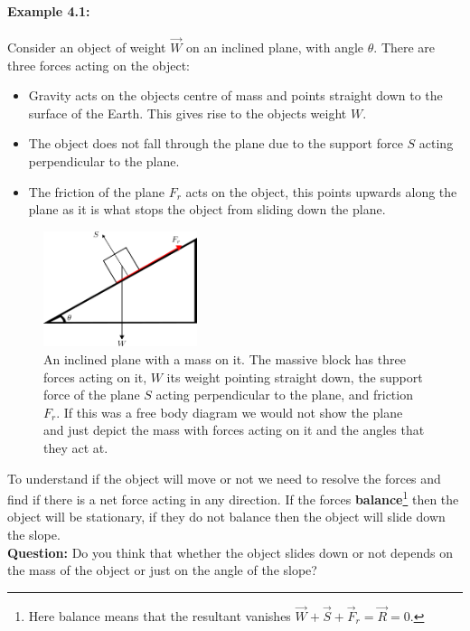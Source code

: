 \documentclass[a4paper,12pt]{book}
\begin{document}
\paragraph{Example 4.1:} Consider an object of weight $\vec{W}$ on an inclined plane, with angle $\theta$. There are three forces acting on the object:
\begin{itemize}
\setlength{\itemsep}{-5pt}
    \item Gravity acts on the objects centre of mass and points straight down to the surface of the Earth. This gives rise to the objects weight $W$.
    \item The object does not fall through the plane due to the support force $S$ acting perpendicular to the plane.
    \item The friction of the plane $F_{r}$ acts on the object, this points upwards along the plane as it is what stops the object from sliding down the plane.
\end{itemize} 

\begin{figure}[ht]
    \centering
   \includegraphics[width=0.4\textwidth]{figures/inclined_plane.png}
    \caption{An inclined plane with a mass on it. The massive block has three forces acting on it, $W$ its weight pointing straight down, the support force of the plane $S$ acting perpendicular to the plane, and friction $F_{r}$. If this was a free body diagram we would not show the plane and just depict the mass with forces acting on it and the angles that they act at.}
\end{figure}

To understand if the object will move or not we need to resolve the forces and find if there is a net force acting in any direction. If the forces \textbf{balance}\footnote{Here balance means that the resultant vanishes $\vec{W}+\vec{S}+\vec{F}_{r}=\vec{R}=0$.} then the object will be stationary, if they do not balance then the object will slide down the slope. \\


\textbf{Question:} Do you think that whether the object slides down or not depends on the mass of the object or just on the angle of the slope?\\
\end{document}
